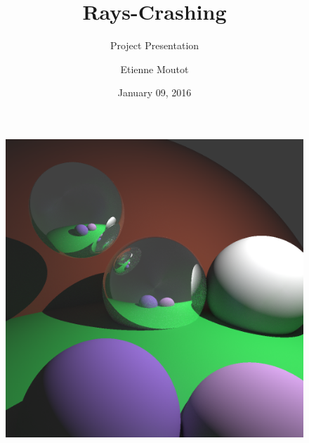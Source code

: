 \documentclass[compress]{beamer}
\title{Rays-Crashing}
\subtitle{Project Presentation}
\date{January 09, 2016}
\author{Etienne Moutot}
\begin{document}

\maketitle





\begin{frame}
	\begin{figure}[htp]
	\centering
	\includegraphics[scale=0.23]{img/ex_1000.png}
	\end{figure}
\end{frame}
\end{document}

